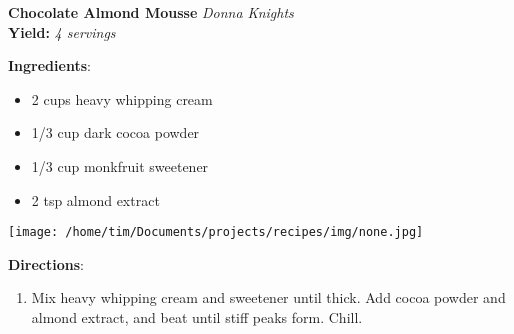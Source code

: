 \documentclass[11pt, twoside, openany]{book}
\begin{document}
\noindent\begin{minipage}[t]{\linewidth}%
{\Large\textbf{Chocolate Almond Mousse}} \label{chocolate-almond-mousse}\hfill\textit{Donna Knights}\\
\textbf{Yield:} \textit{4 servings}\\
\noindent\begin{minipage}[t]{0.78\linewidth}%
\textbf{Ingredients}:\vspace{-3mm}
\begin{multicols}{2}
\begin{itemize}\setlength\itemsep{-1mm}
\item 2 cups heavy whipping cream
\item 1/3 cup dark cocoa powder
\item 1/3 cup monkfruit sweetener
\item 2 tsp almond extract
\end{itemize}
\end{multicols}
\end{minipage}
\noindent\begin{minipage}[t]{0.18\linewidth}
\centering \strut\vspace*{-\baselineskip}\newline
\texttt{[image: /home/tim/Documents/projects/recipes/img/none.jpg]}\\
\end{minipage}\vspace{3mm}
\textbf{Directions}:
\vspace{-3mm}\begin{enumerate}\setlength\itemsep{-1mm}
\item Mix heavy whipping cream and sweetener until thick. Add cocoa powder and almond extract, and beat until stiff peaks form. Chill.
\end{enumerate}
\end{minipage}\vspace{8mm}
\end{document}
